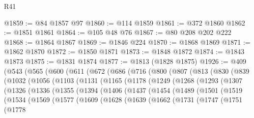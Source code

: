 \begin{lexlean}{R41}
\begin{coremodule}
@1859 := @84 @1857 @97
@1860 := @114 @1859
@1861 := @372 @1860
@1862 := @1851 @1861
@1864 := @105 @48 @76
@1867 := @80 @208 @202 @222
@1868 := @1864 @1867
@1869 := @1846 @224
@1870 := @1868 @1869
@1871 := @1862 @1870
@1872 := @1850 @1871
@1873 := @1848 @1872
@1874 := @1843 @1873
@1875 := @1831 @1874
@1877 := @1813 (@1828 @1875)
@1926 := @409
    (@543
      (@565
        (@600
          (@611
            (@672
              (@686
                (@716
                  (@800
                    (@807
                      (@813
                        (@830
                          (@839
                            (@1032
                              (@1056
                                (@1103
                                  (@1131
                                    (@1165
                                      (@1178
                                        (@1249
                                          (@1268
                                            (@1293
                                              (@1307
                                                (@1326
                                                  (@1336
                                                    (@1355
                                                      (@1394
                                                        (@1406
                                                          (@1437
                                                            (@1454
                                                              (@1489
                                                                (@1501
                                                                  (@1519
                                                                    (@1534
                                                                      (@1569
                                                                        (@1577
                                                                          (@1609
                                                                            (@1628
                                                                              (@1639
                                                                                (@1662
                                                                                  (@1731
                                                                                    (@1747
                                                                                      (@1751
                                                                                        (@1778

\end{coremodule}
\end{lexlean}
